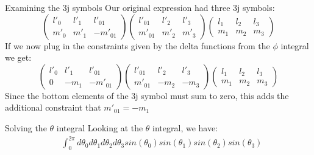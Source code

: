 \documentclass{beamer}
\begin{document}
    \begin{frame}{Examining the 3j symbols}
        Our original expression had three 3j symbols:
        \begin{equation*}
            \begin{pmatrix}
                l'_0 & l'_1 & l'_{01}\\
                m'_0 & m'_1 & -m'_{01}
            \end{pmatrix}
            \begin{pmatrix}
                l'_{01} & l'_2 & l'_{3}\\
                m'_{01} & m'_2 & m'_{3}
            \end{pmatrix}
            \begin{pmatrix}
                l_{1} & l_2 & l_{3}\\
                m_{1} & m_2 & m_{3}
            \end{pmatrix}
        \end{equation*}
        If we now plug in the constraints given by the delta functions from the $\phi$ integral we get:
        \begin{equation*}
            \begin{pmatrix}
                l'_0 & l'_1 & l'_{01}\\
                0 & -m_1 & -m'_{01}
            \end{pmatrix}
            \begin{pmatrix}
                l'_{01} & l'_2 & l'_{3}\\
                m'_{01} & -m_2 & -m_{3}
            \end{pmatrix}
            \begin{pmatrix}
                l_{1} & l_2 & l_{3}\\
                m_{1} & m_2 & m_{3}
            \end{pmatrix}
        \end{equation*}
        Since the bottom elements of the 3j symbol must sum to zero, this adds the additional constraint that $m'_{01}=-m_1$
    \end{frame}

    \begin{frame}{Solving the $\theta$ integral}
        Looking at the $\theta$ integral, we have:
        \begin{align*}
            &\int_0^{2\pi} d\theta_0 d\theta_1 d\theta_2 d\theta_3 sin(\theta_0) sin(\theta_1) sin(\theta_2) sin(\theta_3)
        \end{align*}
    \end{frame}
\end{document}
